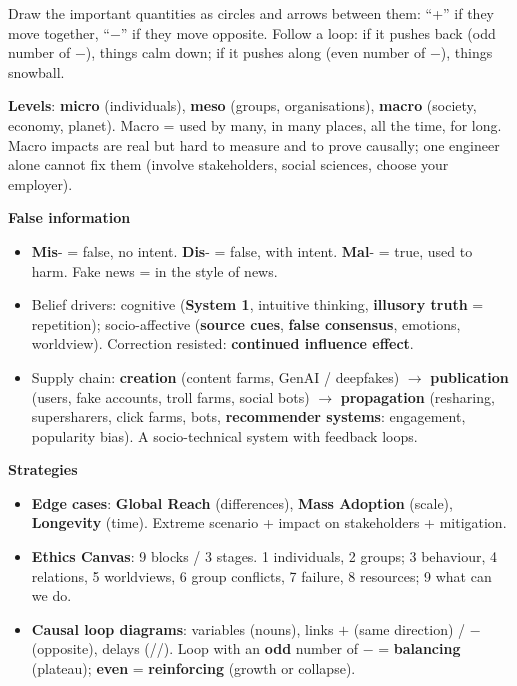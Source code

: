 \documentclass[11pt,a4paper,openany]{book}
\begin{document}
\begin{goatbox}
Draw the important quantities as circles and arrows between them: ``+'' if they move together,
``$-$'' if they move opposite. Follow a loop: if it pushes back (odd number of $-$), things calm
down; if it pushes along (even number of $-$), things snowball.
\end{goatbox}


\begin{recapbox}[title={Exam-ready recap --- Safety 2}]
\textbf{Levels}: \textbf{micro} (individuals), \textbf{meso} (groups, organisations),
\textbf{macro} (society, economy, planet). Macro = used by many, in many places, all the time,
for long. Macro impacts are real but hard to measure and to prove causally; one engineer alone
cannot fix them (involve stakeholders, social sciences, choose your employer).

\textbf{False information}
\begin{itemize}
  \item \textbf{Mis}- = false, no intent. \textbf{Dis}- = false, with intent.
        \textbf{Mal}- = true, used to harm. Fake news = in the style of news.
  \item Belief drivers: cognitive (\textbf{System 1}, intuitive thinking, \textbf{illusory truth}
        = repetition); socio-affective (\textbf{source cues}, \textbf{false consensus},
        emotions, worldview). Correction resisted: \textbf{continued influence effect}.
  \item Supply chain: \textbf{creation} (content farms, GenAI / deepfakes) $\to$
        \textbf{publication} (users, fake accounts, troll farms, social bots) $\to$
        \textbf{propagation} (resharing, supersharers, click farms, bots, \textbf{recommender
        systems}: engagement, popularity bias). A socio-technical system with feedback loops.
\end{itemize}
\textbf{Strategies}
\begin{itemize}
  \item \textbf{Edge cases}: \textbf{Global Reach} (differences), \textbf{Mass Adoption} (scale),
        \textbf{Longevity} (time). Extreme scenario + impact on stakeholders + mitigation.
  \item \textbf{Ethics Canvas}: 9 blocks / 3 stages. 1 individuals, 2 groups; 3 behaviour,
        4 relations, 5 worldviews, 6 group conflicts, 7 failure, 8 resources; 9 what can we do.
  \item \textbf{Causal loop diagrams}: variables (nouns), links $+$ (same direction) / $-$
        (opposite), delays (//). Loop with an \textbf{odd} number of $-$ = \textbf{balancing}
        (plateau); \textbf{even} = \textbf{reinforcing} (growth or collapse).
\end{itemize}
\end{recapbox}
\end{document}
